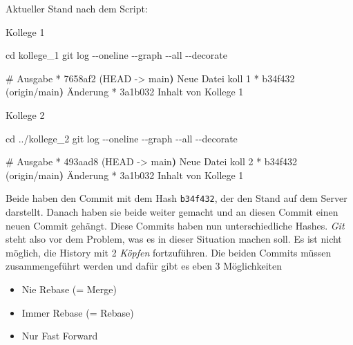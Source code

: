 \documentclass[
  ngerman,
  letterpaper,
  DIV=11]{scrreprt}
\newenvironment{Shaded}{\begin{snugshade}}{\end{snugshade}}
\newcommand{\AttributeTok}[1]{\textcolor[rgb]{0.40,0.45,0.13}{#1}}
\newcommand{\BuiltInTok}[1]{\textcolor[rgb]{0.00,0.23,0.31}{#1}}
\newcommand{\CommentTok}[1]{\textcolor[rgb]{0.37,0.37,0.37}{#1}}
\newcommand{\ErrorTok}[1]{\textcolor[rgb]{0.68,0.00,0.00}{#1}}
\newcommand{\ExtensionTok}[1]{\textcolor[rgb]{0.00,0.23,0.31}{#1}}
\newcommand{\FunctionTok}[1]{\textcolor[rgb]{0.28,0.35,0.67}{#1}}
\newcommand{\KeywordTok}[1]{\textcolor[rgb]{0.00,0.23,0.31}{\textbf{#1}}}
\newcommand{\NormalTok}[1]{\textcolor[rgb]{0.00,0.23,0.31}{#1}}
\newcommand{\OperatorTok}[1]{\textcolor[rgb]{0.37,0.37,0.37}{#1}}
\providecommand{\tightlist}{%
  \setlength{\itemsep}{0pt}\setlength{\parskip}{0pt}}
\newcommand{\Git}{\textit{Git}\xspace}
\begin{document}
Aktueller Stand nach dem Script:

Kollege 1

\begin{Shaded}
\begin{Highlighting}[]
\BuiltInTok{cd}\NormalTok{ kollege\_1 }
\FunctionTok{git}\NormalTok{ log }\AttributeTok{{-}{-}oneline} \AttributeTok{{-}{-}graph} \AttributeTok{{-}{-}all} \AttributeTok{{-}{-}decorate}

\CommentTok{\# Ausgabe}
\ExtensionTok{*}\NormalTok{ 7658af2 }\ErrorTok{(}\ExtensionTok{HEAD} \AttributeTok{{-}}\OperatorTok{\textgreater{}}\NormalTok{ main}\KeywordTok{)} \ExtensionTok{Neue}\NormalTok{ Datei koll 1}
\ExtensionTok{*}\NormalTok{ b34f432 }\ErrorTok{(}\ExtensionTok{origin/main}\KeywordTok{)} \ExtensionTok{Änderung}
\ExtensionTok{*}\NormalTok{ 3a1b032 Inhalt von Kollege 1}
\end{Highlighting}
\end{Shaded}

Kollege 2

\begin{Shaded}
\begin{Highlighting}[]
\BuiltInTok{cd}\NormalTok{ ../kollege\_2}
\FunctionTok{git}\NormalTok{ log }\AttributeTok{{-}{-}oneline} \AttributeTok{{-}{-}graph} \AttributeTok{{-}{-}all} \AttributeTok{{-}{-}decorate}

\CommentTok{\# Ausgabe}
\ExtensionTok{*}\NormalTok{ 493aad8 }\ErrorTok{(}\ExtensionTok{HEAD} \AttributeTok{{-}}\OperatorTok{\textgreater{}}\NormalTok{ main}\KeywordTok{)} \ExtensionTok{Neue}\NormalTok{ Datei koll 2}
\ExtensionTok{*}\NormalTok{ b34f432 }\ErrorTok{(}\ExtensionTok{origin/main}\KeywordTok{)} \ExtensionTok{Änderung}
\ExtensionTok{*}\NormalTok{ 3a1b032 Inhalt von Kollege 1}
\end{Highlighting}
\end{Shaded}

Beide haben den Commit mit dem Hash \texttt{b34f432}, der den Stand auf
dem Server darstellt. Danach haben sie beide weiter gemacht und an
diesen Commit einen neuen Commit gehängt. Diese Commits haben nun
unterschiedliche Hashes. \Git steht also vor dem Problem, was es in
dieser Situation machen soll. Es ist nicht möglich, die History mit 2
\emph{Köpfen} fortzuführen. Die beiden Commits müssen zusammengeführt
werden und dafür gibt es eben 3 Möglichkeiten

\begin{itemize}
\tightlist
\item
  Nie Rebase (= Merge)
\item
  Immer Rebase (= Rebase)
\item
  Nur Fast Forward
\end{itemize}
\end{document}
